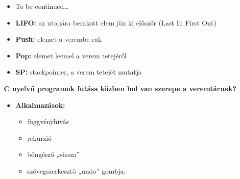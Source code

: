 \documentclass[12pt,a4paper]{article}
\begin{document}
            \begin{tcolorbox}[colback=blue!5!white,colframe=blue!50!black,title= 23. Ismertesse a bináris fák szerkezetét és tárolási lehetőségeit számítógépen!]
                \begin{itemize}
                    \item To be continued…
                \end{itemize}
            \end{tcolorbox}
            
            \begin{tcolorbox}[colback=blue!5!white,colframe=blue!50!black,title= 24. Ismertesse a veremtár működését!]
                \begin{itemize}
                    \item \textbf{LIFO:} az utoljára berakott elem jön ki először (Last In First Out)
                    \item \textbf{Push:} elemet a verembe rak
                    \item \textbf{Pop:} elemet leemel a verem tetejéről
                    \item \textbf{SP:} stackpointer, a verem tetejét mutatja
                \end{itemize}
                \textbf{C nyelvű programok futása közben hol van szerepe a veremtárnak?}
                \begin{itemize}
                    \item \textbf{Alkalmazások:}
                    \begin{itemize}
                        \item függvényhívás
                        \item rekurzió
                        \item böngésző „vissza”
                        \item szövegszerkesztő „undo” gombja.
                    \end{itemize}
                \end{itemize}
            \end{tcolorbox}
            
\end{document}
